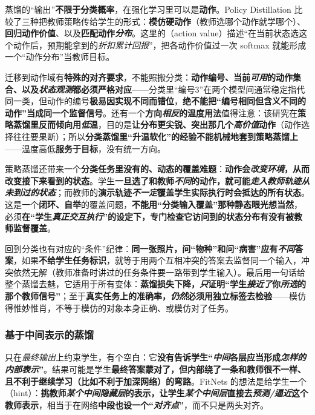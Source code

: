 蒸馏的“输出”\textbf{不限于分类概率}，在强化学习里可以是\textbf{动作}。Policy Distillation 比较了三种把教师策略传给学生的形式：\textbf{模仿硬动作}（教师选哪个动作就学哪个）、\textbf{回归动作价值}、以及\textbf{匹配动作\emph{分布}}。这里的（action value）描述“在当前状态选这个动作后，预期能拿到的\emph{折扣累计回报}”，把各动作价值过一次 softmax 就能形成一个“动作分布”当教师目标。

迁移到动作域有\textbf{特殊的对齐要求}，不能照搬分类：\textbf{动作编号、当前\emph{可用}的动作集合、以及\emph{状态观测}都必须严格对应}——分类里“编号3”在两个模型间通常稳定指代同一类，但动作的编号\textbf{极易因实现不同而错位}，\textbf{绝不能把“编号相同但含义不同的动作”当成同一个监督信号}。还有一个\textbf{方向\emph{相反}的温度用法}值得注意：该研究在\textbf{策略蒸馏里反而倾向用\emph{低}温}，目的是\textbf{让分布更尖锐、突出那几个\emph{高价值}动作}（动作选择往往要果断）；所以\textbf{分类蒸馏里“升温软化”的经验\textbf{不能机械地套到}策略蒸馏上}——温度高低\textbf{服务于目标}，没有统一方向。

策略蒸馏还带来一个\textbf{分类任务里没有的、动态的覆盖难题}：\textbf{动作会\emph{改变环境}，从而改变接下来看到的状态}。学生\textbf{一旦选了和教师\emph{不同}的动作，就可能\emph{走入教师轨迹\emph{从未到过}的状态}}；而教师的\textbf{演示轨迹\emph{不一定}覆盖学生实际执行时会抵达的所有状态}。这是一个\textbf{闭环、自举}的覆盖问题，\textbf{不能用“分类输入覆盖”那种静态眼光想当然}，必须\textbf{在“学生\emph{真正交互执行}”的设定下，专门检查它访问到的状态分布有没有被教师监督覆盖}。

回到分类也有对应的“条件”纪律：\textbf{同一张照片，问“物种”和问“病害”应有\emph{不同}答案}，如果\textbf{不给学生任务标识}，就等于用两个互相冲突的答案去监督同一个输入，冲突依然无解（教师准备时讲过的任务条件要一路带到学生输入）。最后用一句话给整个蒸馏去魅，它适用于所有变体：\textbf{蒸馏损失下降，\emph{只}证明“学生\emph{接近了}你\emph{所选}的那个教师信号”}；至于\textbf{真实任务上的准确率，\emph{仍然}必须用独立标签去检验}——模仿得惟妙惟肖，不等于模仿的对象本身正确、或模仿对了任务。

\subsubsection{基于中间表示的蒸馏}
\label{sec:ket-integration-feature-distillation}

只在\emph{最终输出}上约束学生，有个空白：它\textbf{没有告诉学生“\emph{中间}各层应当形成\emph{怎样的内部表示}”}。结果可能是学生\textbf{最终答案蒙对了，但内部绕了一条和教师很不一样、且不利于继续学习（比如不利于加深网络）的弯路}。FitNets 的想法是给学生一个（hint）：\textbf{挑教师\emph{某个中间隐藏层}的表示，让学生\emph{某个中间层}直接去\emph{预测/逼近}这个教师表示}，相当于在网络\textbf{中段也设一个“\emph{对齐点}”}，而不只是两头对齐。

